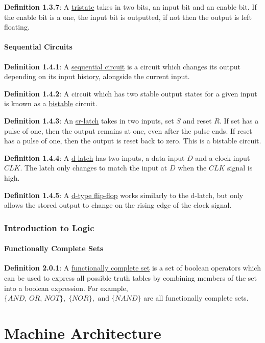 \documentclass{article}
\newcommand{\separate}[1] {\vspace{#1 pt}\noindent}
\newcommand{\definition}[2]{\textbf{Definition #1}: #2\label{def:#1}}
\begin{document}
\separate{5}\definition{1.3.7}{A \underline{tristate} takes in two bits, an input bit and an enable bit. If the enable bit is a one, the input bit is outputted, if not then the output is left floating.}

\subsection{Sequential Circuits}

\definition{1.4.1}{A \underline{sequential circuit} is a circuit which changes its output depending on its input history, alongside the current input.}

\separate{5}\definition{1.4.2}{A circuit which has two stable output states for a given input is known as a \underline{bistable} circuit.}

\separate{5}\definition{1.4.3}{An \underline{sr-latch} takes in two inputs, set \(S\) and reset \(R\). If set has a pulse of one, then the output remains at one, even after the pulse ends. If reset has a pulse of one, then the output is reset back to zero. This is a bistable circuit.}

\separate{5}\definition{1.4.4}{A \underline{d-latch} has two inputs, a data input \(D\) and a clock input \(CLK\). The latch only changes to match the input at \(D\) when the \(CLK\) signal is high.}

\separate{5}\definition{1.4.5}{A \underline{d-type flip-flop} works similarly to the d-latch, but only allows the stored output to change on the rising edge of the clock signal.}

\section{Introduction to Logic}

\subsection{Functionally Complete Sets}

\definition{2.0.1}{A \underline{functionally complete set} is a set of boolean operators which can be used to express all possible truth tables by combining members of the set into a boolean expression. For example,
\(\{AND,\,OR,\,NOT\},\;\{NOR\},\text{ and}\;\{NAND\}\) are all functionally complete sets.}

\newpage\part{Machine Architecture}\label{part:2.ma}
\end{document}
